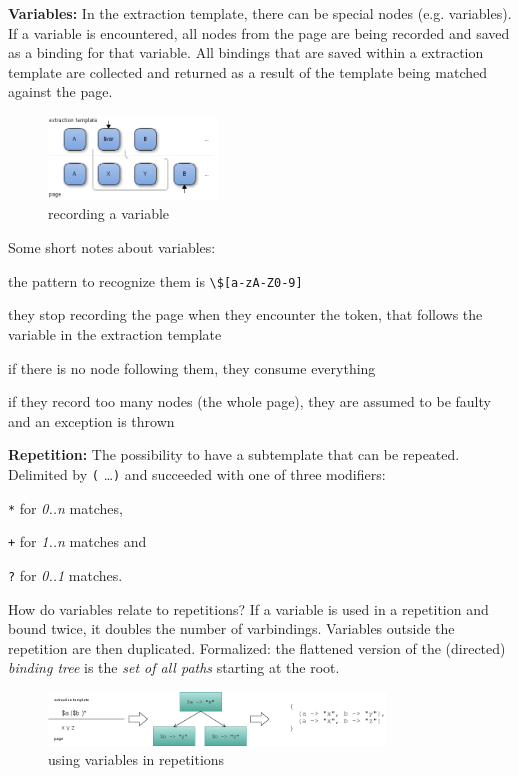 \textbf{Variables:}
In the extraction template, there can be special nodes (e.g. variables). 
If a variable is encountered, all nodes from the page are being recorded and saved as a binding for that variable. 
All bindings that are saved within a extraction template are collected and returned as a result of the template being matched against the page.
\begin{figure}[h]
\centering
\includegraphics[width=0.4\textwidth]{../images/varbinding}
\caption{recording a variable}
\label{fig:varbinding}
\end{figure}
Some short notes about variables:
\begin{compactitem}
\item the pattern to recognize them is \texttt{\textbackslash\$[a-zA-Z0-9]}
\item they stop recording the page when they encounter the token, that follows the variable in the extraction template
\item if there is no node following them, they consume everything
\item if they record too many nodes (the whole page), they are assumed to be faulty and an exception is thrown
\end{compactitem}
\textbf{Repetition:}
The possibility to have a subtemplate that can be repeated. 
Delimited by \texttt{(} \ldots \texttt{)} and succeeded with one of three modifiers:
\begin{compactitem}
\item \texttt{*} for \textit{0..n} matches,
\item \texttt{+} for \textit{1..n} matches and 
\item \texttt{?} for \textit{0..1} matches.
\end{compactitem}
How do variables relate to repetitions? If a variable is used in a repetition and bound twice, it doubles the number of varbindings. 
Variables outside the repetition are then duplicated. Formalized: the flattened version of the (directed) \textit{binding tree} is the \textit{set of all paths} starting at the root.
\begin{figure}[htbp]
\centering
\includegraphics[width=0.8\textwidth]{../images/varlist}
\caption{using variables in repetitions}
\label{fig:varlist}
\end{figure}\newline

